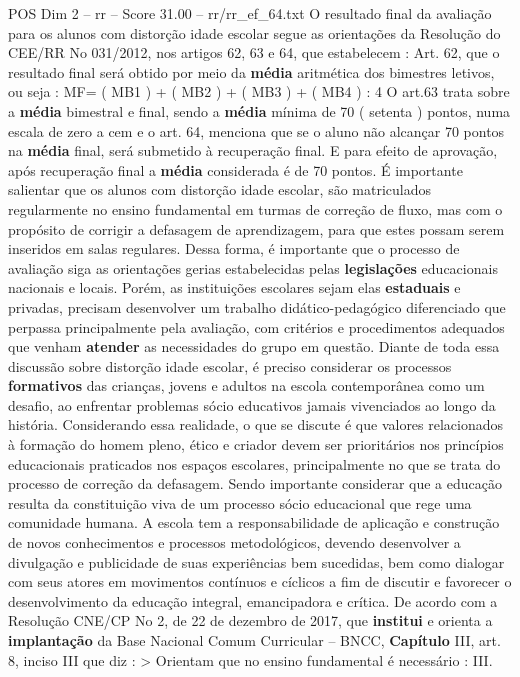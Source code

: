 \begin{textsample}{POS Dim 2 – rr – Score 31.00 – rr/rr\_ef\_64.txt}
O resultado final da avaliação para os alunos com distorção idade escolar segue as orientações da Resolução do CEE/RR No 031/2012, nos artigos 62, 63 e 64, que estabelecem : Art. 62, que o resultado final será obtido por meio da \textbf{média} aritmética dos bimestres letivos, ou seja : MF= ( MB1 ) + ( MB2 ) + ( MB3 ) + ( MB4 ) : 4 O art.63 trata sobre a \textbf{média} bimestral e final, sendo a \textbf{média} mínima de 70 ( setenta ) pontos, numa escala de zero a cem e o art. 64, menciona que se o aluno não alcançar 70 pontos na \textbf{média} final, será submetido à recuperação final.
E para efeito de aprovação, após recuperação final a \textbf{média} considerada é de 70 pontos.
É importante salientar que os alunos com distorção idade escolar, são matriculados regularmente no ensino fundamental em turmas de correção de fluxo, mas com o propósito de corrigir a defasagem de aprendizagem, para que estes possam serem inseridos em salas regulares.
Dessa forma, é importante que o processo de avaliação siga as orientações gerias estabelecidas pelas \textbf{legislações} educacionais nacionais e locais.
Porém, as instituições escolares sejam elas \textbf{estaduais} e privadas, precisam desenvolver um trabalho didático-pedagógico diferenciado que perpassa principalmente pela avaliação, com critérios e procedimentos adequados que venham \textbf{atender} as necessidades do grupo em questão.
Diante de toda essa discussão sobre distorção idade escolar, é preciso considerar os processos \textbf{formativos} das crianças, jovens e adultos na escola contemporânea como um desafio, ao enfrentar problemas sócio educativos jamais vivenciados ao longo da história.
Considerando essa realidade, o que se discute é que valores relacionados à formação do homem pleno, ético e criador devem ser prioritários nos princípios educacionais praticados nos espaços escolares, principalmente no que se trata do processo de correção da defasagem.
Sendo importante considerar que a educação resulta da constituição viva de um processo sócio educacional que rege uma comunidade humana.
A escola tem a responsabilidade de aplicação e construção de novos conhecimentos e processos metodológicos, devendo desenvolver a divulgação e publicidade de suas experiências bem sucedidas, bem como dialogar com seus atores em movimentos contínuos e cíclicos a fim de discutir e favorecer o desenvolvimento da educação integral, emancipadora e crítica.
De acordo com a Resolução CNE/CP No 2, de 22 de dezembro de 2017, que \textbf{institui} e orienta a \textbf{implantação} da Base Nacional Comum Curricular – BNCC, \textbf{Capítulo} III, art. 8, inciso III que diz : > Orientam que no ensino fundamental é necessário : III.

\end{textsample}
